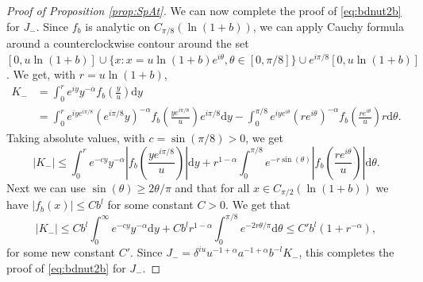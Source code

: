 \documentclass[]{scrartcl}
\renewcommand{\d}{\mathrm{d}}
\numberwithin{equation}{section}
\numberwithin{figure}{section}
\begin{document}
\begin{proof}[Proof of Proposition \ref{prop:SpAt}]
We can now complete the proof of \eqref{eq:bdnut2b} for $J_-$. Since  $f_b$ is analytic on $C_{\pi/8}  (\ln (1+b))$, we can apply Cauchy formula around a counterclockwise contour around the set $[0,u \ln (1+b)] \cup \{ x : x =  u \ln (1+b) e^{i \theta} , \theta \in [0,\pi/8]\} \cup e^{i \pi/8} [0,u \ln (1+b)]$. We get, with $r = u \ln (1+ b)$,
\begin{align*}
	K_- & = \int_{0}^{r} e^{iy} y^{-\alpha} f_b\left(\frac y u \right) \d y \\
	& = \int_{0}^{r} e^{iy  e^{i\pi/8}} ( e^{i\pi/8} y)^{-\alpha} f_b\left(\frac {y  e^{i\pi/8}}{ u}  \right) e^{i\pi/8}\d y -  \int_{0}^{\pi/8} e^{iy e^{i \theta} } (r e^{i\theta}) ^{-\alpha} f_b\left(\frac {r e^{i \theta}}{ u}  \right) r \d \theta.
\end{align*}
Taking absolute values, with $c = \sin (\pi/8) > 0$, we get 
$$
| K_- | \leq \int_{0}^{r} e^{-c y } y^{-\alpha} \left| f_b\left(\frac {y  e^{i\pi/8}}{ u}  \right)\right|  \d y + r^{1-\alpha} \int_{0}^{\pi/8} e^{- r \sin ( \theta) }  \left|f_b\left(\frac {r e^{i \theta}}{ u}  \right)\right|  \d \theta.
$$
Next we can use $\sin(\theta ) \geq 2 \theta / \pi$ and that for all $x \in C_{\pi/2}( \ln(1+b))$ we have $|f_b(x)| \leq C b^l$  for some constant $C > 0$. We get that
$$
| K_- | \leq C  b^l \int_0^\infty e^{-cy} y^{-\alpha} \d y + C b^l r^{1-\alpha}  \int_{0}^{\pi/8} e^{- 2 r \theta / \pi } \d\theta \leq C' b^l ( 1+ r^{-\alpha}),  
$$
for some new constant $C'$. Since $J_- = \delta^{iu} u^{-1+\alpha} a^{-1 + \alpha } b ^{-l} K_-$, this completes the proof of \eqref{eq:bdnut2b} for $J_-$. 



\end{proof}
\end{document}
